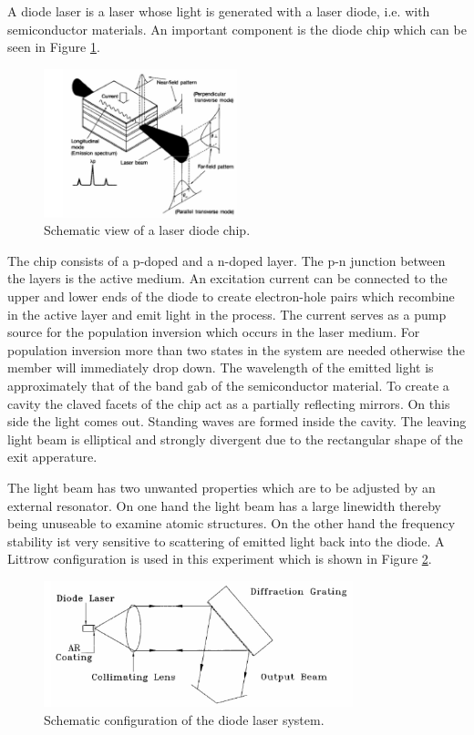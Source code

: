 A diode laser is a laser whose light is generated with a laser diode, i.e. with semiconductor materials.
An important component is the diode chip which can be seen in Figure \ref{fig:diodechip}.
\begin{figure}[H]
    \centering
    \includegraphics[width=0.5\textwidth]{content/graphics/laserdiodechip.jpg}
    \caption{Schematic view of a laser diode chip. \cite{diode_laser}} %
    \label{fig:diodechip}
\end{figure}
The chip consists of a p-doped and a n-doped layer. The p-n junction between the layers is the active medium.
An excitation current can be connected to the upper and lower ends of the diode to create electron-hole pairs which recombine in the active layer and
emit light in the process. The current serves as a pump source for the population inversion which occurs in the laser medium.
For population inversion more than two states in the system are needed otherwise the member will immediately drop down.
The wavelength of the emitted light is approximately that of the band gab of the semiconductor material.
To create a cavity the claved facets of the chip act as a partially reflecting mirrors.
On this side the light comes out.
Standing waves are formed inside the cavity. The leaving light beam is elliptical and strongly divergent due to the rectangular shape of the
exit apperature.

The light beam has two unwanted properties which are to be adjusted by an external resonator.
On one hand the light beam has a large linewidth thereby being unuseable to examine atomic structures.
On the other hand the frequency stability ist very sensitive to scattering of emitted light back into the diode.
A Littrow configuration is used in this experiment which is shown in Figure \ref{fig:configuration}. 
\begin{figure}[H]
    \centering
    \includegraphics[width=0.8\textwidth]{content/graphics/configuration.jpg}
    \caption{Schematic configuration of the diode laser system. \cite{diode_laser}} %
    \label{fig:configuration}
\end{figure}

